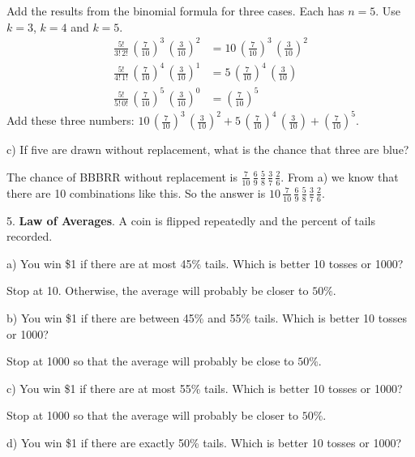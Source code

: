 \documentclass[10pt]{article}
\begin{document}
{\color{blue} Add the results from the binomial formula for three cases.  Each has $n=5$. Use $k=3$, $k=4$ and $k=5$.
\begin{align*}
\frac{5!}{3!\,2!}\,\left(\frac{7}{10}\right)^3\,\left(\frac{3}{10}\right)^2 
     &=10\,\left(\frac{7}{10}\right)^3\,\left(\frac{3}{10}\right)^2\\
\frac{5!}{4!\,1!}\,\left(\frac{7}{10}\right)^4\,\left(\frac{3}{10}\right)^1 
     &=5\,\left(\frac{7}{10}\right)^4\,\left(\frac{3}{10}\right)\\
\frac{5!}{5!\,0!}\,\left(\frac{7}{10}\right)^5\,\left(\frac{3}{10}\right)^0
     &=\left(\frac{7}{10}\right)^5
\end{align*}
Add these three numbers:  $10\,\left(\frac{7}{10}\right)^3\,\left(\frac{3}{10}\right)^2
 + 5\,\left(\frac{7}{10}\right)^4\,\left(\frac{3}{10}\right)
 + \left(\frac{7}{10}\right)^5$.}


\hspace{10pt} c) If five  are drawn without replacement, what is the chance that three are blue?

{\color{blue} The chance of BBBRR without 
replacement is $\frac{7}{10}\,\frac{6}{9}\,\frac{5}{8}\,\frac{3}{7}\,\frac{2}{6}$.  From a) we know
that there are 10 combinations like this.  So the answer is 
$10\,\frac{7}{10}\,\frac{6}{9}\,\frac{5}{8}\,\frac{3}{7}\,\frac{2}{6}$.} 
\vfill
\eject

5. \textbf{Law of Averages}.  A coin is flipped repeatedly and the percent of tails recorded.

\hspace{10pt} a) You win \$1 if there are at most 45\% tails.  Which is better 10 tosses or 1000?

{\color{blue} Stop at 10.  Otherwise, the average will probably be closer to $50\%$.}

\hspace{10pt} b) You win \$1 if there are between  45\% and 55\% tails.  Which is better 10 tosses or 1000?

{\color{blue} Stop at 1000 so that the average will probably be close to $50\%$.}

\hspace{10pt} c) You win \$1 if there are at most 55\% tails.  Which is better 10 tosses or 1000?

{\color{blue} Stop at 1000 so that the average will probably be closer to $50\%$.}
\vspace{.2in}

\hspace{10pt} d) You win \$1 if there are exactly  50\% tails. Which is better 10 tosses or 1000?
\end{document}
